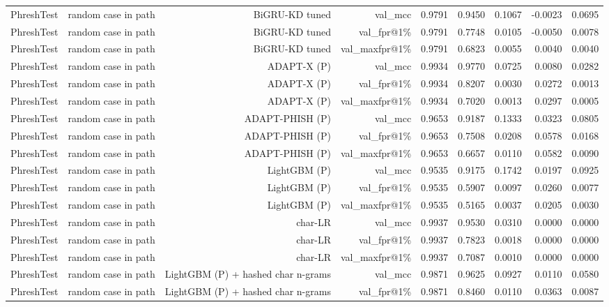 \begin{table}[t]
\begin{tabular}{llrrrrrrr}
PhreshTest & random case in path & BiGRU-KD tuned & val\_mcc & 0.9791 & 0.9450 & 0.1067 & -0.0023 & 0.0695 \\
PhreshTest & random case in path & BiGRU-KD tuned & val\_fpr@1\% & 0.9791 & 0.7748 & 0.0105 & -0.0050 & 0.0078 \\
PhreshTest & random case in path & BiGRU-KD tuned & val\_maxfpr@1\% & 0.9791 & 0.6823 & 0.0055 & 0.0040 & 0.0040 \\
PhreshTest & random case in path & ADAPT-X (P) & val\_mcc & 0.9934 & 0.9770 & 0.0725 & 0.0080 & 0.0282 \\
PhreshTest & random case in path & ADAPT-X (P) & val\_fpr@1\% & 0.9934 & 0.8207 & 0.0030 & 0.0272 & 0.0013 \\
PhreshTest & random case in path & ADAPT-X (P) & val\_maxfpr@1\% & 0.9934 & 0.7020 & 0.0013 & 0.0297 & 0.0005 \\
PhreshTest & random case in path & ADAPT-PHISH (P) & val\_mcc & 0.9653 & 0.9187 & 0.1333 & 0.0323 & 0.0805 \\
PhreshTest & random case in path & ADAPT-PHISH (P) & val\_fpr@1\% & 0.9653 & 0.7508 & 0.0208 & 0.0578 & 0.0168 \\
PhreshTest & random case in path & ADAPT-PHISH (P) & val\_maxfpr@1\% & 0.9653 & 0.6657 & 0.0110 & 0.0582 & 0.0090 \\
PhreshTest & random case in path & LightGBM (P) & val\_mcc & 0.9535 & 0.9175 & 0.1742 & 0.0197 & 0.0925 \\
PhreshTest & random case in path & LightGBM (P) & val\_fpr@1\% & 0.9535 & 0.5907 & 0.0097 & 0.0260 & 0.0077 \\
PhreshTest & random case in path & LightGBM (P) & val\_maxfpr@1\% & 0.9535 & 0.5165 & 0.0037 & 0.0205 & 0.0030 \\
PhreshTest & random case in path & char-LR & val\_mcc & 0.9937 & 0.9530 & 0.0310 & 0.0000 & 0.0000 \\
PhreshTest & random case in path & char-LR & val\_fpr@1\% & 0.9937 & 0.7823 & 0.0018 & 0.0000 & 0.0000 \\
PhreshTest & random case in path & char-LR & val\_maxfpr@1\% & 0.9937 & 0.7087 & 0.0010 & 0.0000 & 0.0000 \\
PhreshTest & random case in path & LightGBM (P) + hashed char n-grams & val\_mcc & 0.9871 & 0.9625 & 0.0927 & 0.0110 & 0.0580 \\
PhreshTest & random case in path & LightGBM (P) + hashed char n-grams & val\_fpr@1\% & 0.9871 & 0.8460 & 0.0110 & 0.0363 & 0.0087 \\

\end{tabular}
\end{table}
